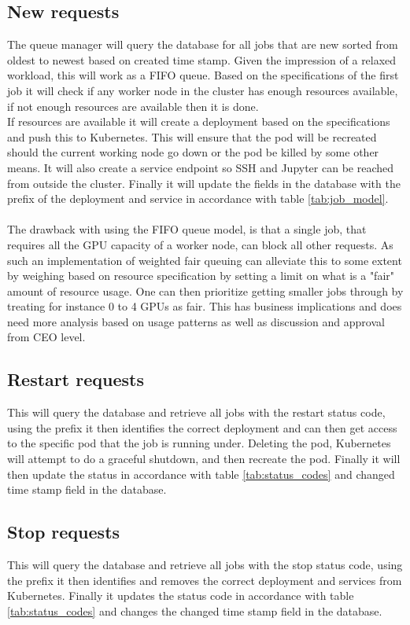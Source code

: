 \documentclass[../main.tex]{subfiles}
\begin{document}
\subsection*{New requests}
The queue manager will query the database for all jobs that are new sorted from oldest to newest based on created time stamp. Given the impression of a relaxed workload, this will work as a FIFO queue. Based on the specifications of the first job it will check if any worker node in the cluster has enough resources available, if not enough resources are available then it is done.\\
If resources are available it will create a deployment based on the specifications and push this to Kubernetes. This will ensure that the pod will be recreated should the current working node go down or the pod be killed by some other means. It will also create a service endpoint so SSH and Jupyter can be reached from outside the cluster. Finally it will update the fields in the database with the prefix of the deployment and service in accordance with table \ref{tab:job_model}.\\\\
The drawback with using the FIFO queue model, is that a single job, that requires all the GPU capacity of a worker node, can block all other requests. As such an implementation of weighted fair queuing can alleviate this to some extent by weighing based on resource specification by setting a limit on what is a "fair" amount of resource usage. One can then prioritize getting smaller jobs through by treating for instance 0 to 4 GPUs as fair. This has business implications and does need more analysis based on usage patterns as well as discussion and approval from CEO level.

\subsection*{Restart requests}
This will query the database and retrieve all jobs with the restart status code, using the prefix it then identifies the correct deployment and can then get access to the specific pod that the job is running under. Deleting the pod, Kubernetes will attempt to do a graceful shutdown, and then recreate the pod. Finally it will then update the status in accordance with table \ref{tab:status_codes} and changed time stamp field in the database.

\subsection*{Stop requests}
This will query the database and retrieve all jobs with the stop status code, using the prefix it then identifies and removes the correct deployment and services from Kubernetes. Finally it updates the status code in accordance with table \ref{tab:status_codes} and changes the changed time stamp field in the database.
\end{document}
